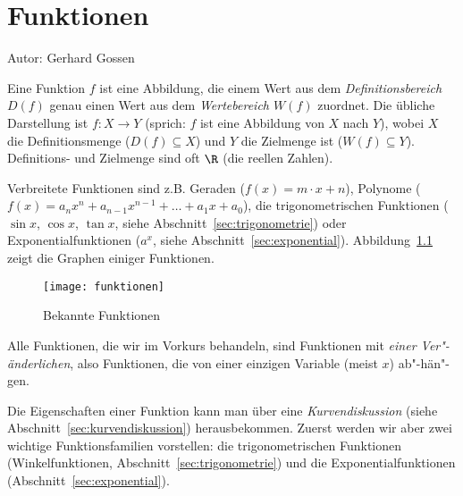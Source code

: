 \chapter{Funktionen}
\label{chap:funktionen}

Autor: Gerhard Gossen

\mbox{}\par

\noindent Eine Funktion $f$ ist eine Abbildung, die einem Wert aus dem \emph{Definitionsbereich $D(f)$} genau einen Wert aus dem \emph{Wertebereich $W(f)$} zuordnet. Die übliche Darstellung ist
$f : X \to Y$ (sprich: $f$ ist eine Abbildung von $X$ nach $Y$), wobei $X$ die Definitionsmenge ($D(f) \subseteq X$) und $Y$ die Zielmenge ist ($W(f) \subseteq Y$). Definitions- und Zielmenge sind oft $\R$ (die reellen Zahlen).

Verbreitete Funktionen sind z.B. Geraden ($f(x) = m\cdot x +n$), Polynome ($f(x) = a_n x^n + a_{n-1} x^{n-1}+\dots + a_1x+a_0$), die trigonometrischen Funktionen ($\sin x$, $\cos x$, $\tan x$, siehe Abschnitt~\ref{sec:trigonometrie}) oder Exponentialfunktionen ($a^x$, siehe Abschnitt~\ref{sec:exponential}). Abbildung~\ref{fig:funktionen} zeigt die Graphen einiger Funktionen.

\begin{figure}[bth]
\begin{center}
    \texttt{[image: funktionen]}
\end{center}
\caption{Bekannte Funktionen}
\label{fig:funktionen}
\end{figure} 

Alle Funktionen, die wir im Vorkurs behandeln, sind Funktionen mit \emph{einer Ver"-änderlichen}, also Funktionen, die von einer einzigen Variable (meist $x$) ab"-hän"-gen. %

Die Eigenschaften einer Funktion kann man über eine \emph{Kurvendiskussion} (siehe Abschnitt~\ref{sec:kurvendiskussion}) herausbekommen. Zuerst werden wir aber zwei wichtige Funktionsfamilien vorstellen: die trigonometrischen Funktionen (Winkelfunktionen, Abschnitt~\ref{sec:trigonometrie}) und die Exponentialfunktionen (Abschnitt~\ref{sec:exponential}).